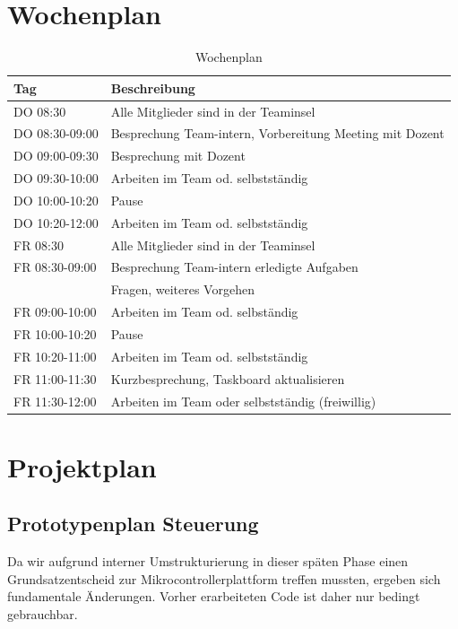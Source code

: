 \documentclass[a4paper]{report}
\begin{document}
\section{Wochenplan}
\label{sec:Wochenplan}
\begin{table}[h!]
	\begin{tabular}{|p{}|p{}|}
		\hline
		\textbf{Tag} & \textbf{Beschreibung} \\
		\hline
		DO 08:30 & Alle Mitglieder sind in der Teaminsel \\
		\hline
		DO 08:30-09:00 & Besprechung Team-intern, Vorbereitung Meeting mit Dozent \\
		\hline
		DO 09:00-09:30& Besprechung mit Dozent \\
		\hline
		DO 09:30-10:00 & Arbeiten im Team od. selbstständig \\
		\hline
		DO 10:00-10:20 & Pause \\
		\hline
		DO 10:20-12:00 & Arbeiten im Team od. selbstständig \\
		\hline
		FR 08:30 & Alle Mitglieder sind in der Teaminsel \\
		\hline
		FR 08:30-09:00 & Besprechung Team-intern erledigte Aufgaben \\
		& Fragen, weiteres Vorgehen \\
		\hline
		FR 09:00-10:00 & Arbeiten im Team od. selbständig \\
		\hline
		FR 10:00-10:20 & Pause \\
		\hline
		FR 10:20-11:00 & Arbeiten im Team od. selbstständig \\
		\hline
		FR 11:00-11:30 & Kurzbesprechung, Taskboard aktualisieren \\
		\hline
		FR 11:30-12:00 & Arbeiten im Team oder selbstständig (freiwillig)\\
		\hline
	\end{tabular}
	\caption{Wochenplan}
	\label{tab:Wochenplan}
\end{table}

\newpage

\section{Projektplan}
\label{sec:Projektplan}

\subsection{Prototypenplan Steuerung}
\label{ssec:ProtoSteuerung}
Da wir aufgrund interner Umstrukturierung in dieser späten Phase einen Grundsatzentscheid zur Mikrocontrollerplattform treffen mussten, ergeben sich fundamentale Änderungen. Vorher erarbeiteten Code ist daher nur bedingt gebrauchbar.
\end{document}
